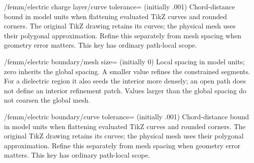 \begin{key}{/femm/electric charge layer/curve tolerance= (initially .001)}
Chord-distance bound in model units when flattening evaluated TikZ curves and
rounded corners. The original TikZ drawing retains its curves; the physical
mesh uses their polygonal approximation. Refine this separately from mesh
spacing when geometry error matters. This key has ordinary path-local scope.
\end{key}
\begin{key}{/femm/electric boundary/mesh size= (initially 0)}
Local spacing in model units; zero inherits the global spacing. A smaller
value refines the constrained segments. For a dielectric region it also seeds
the interior more densely; an open path does not define an interior refinement
patch. Values larger than the global spacing do not coarsen the global mesh.
\end{key}
\begin{key}{/femm/electric boundary/curve tolerance= (initially .001)}
Chord-distance bound in model units when flattening evaluated TikZ curves and
rounded corners. The original TikZ drawing retains its curves; the physical
mesh uses their polygonal approximation. Refine this separately from mesh
spacing when geometry error matters. This key has ordinary path-local scope.
\end{key}

\begin{codeexample}[width=0pt]
\end{codeexample}

